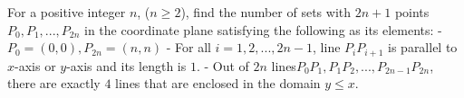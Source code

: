 For a positive integer $n$, ($n\ge  2$), find the number of sets with $2n + 1$ points $P_0, P_1,..., P_{2n}$ in the coordinate plane satisfying the following as its elements:
- $P_0 = (0, 0),P_{2n}= (n, n)$
- For all $i = 1,2,..., 2n - 1$, line $P_iP_{i+1}$ is parallel to $x$-axis or $y$-axis and its length is $1$.
- Out of $2n$ lines$P_0P_1, P_1P_2,..., P_{2n-1}P_{2n}$, there are exactly $4$ lines that are enclosed in the domain $y \le x$.